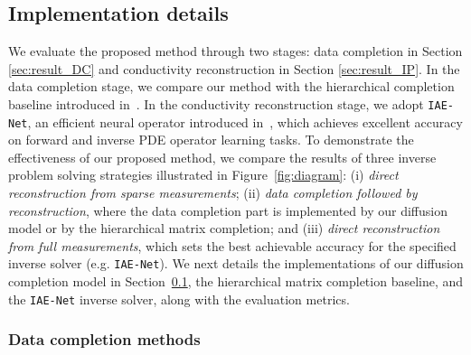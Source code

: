 \documentclass{article}
\begin{document}
\subsection{Implementation details}\label{sec:Implement_details}
We evaluate the proposed method through two stages: data completion in Section \ref{sec:result_DC} and conductivity reconstruction in Section \ref{sec:result_IP}. 
In the data completion stage, we compare our method with the hierarchical completion baseline introduced in~\citet{bui2022bridging}. In the conductivity reconstruction stage, we adopt \texttt{IAE-Net}, an efficient neural operator introduced in~\citet{ong2022integral}, which achieves excellent accuracy on forward and inverse PDE operator learning tasks.
To demonstrate the effectiveness of our proposed method, we compare the results of three inverse problem solving strategies illustrated in Figure~\ref{fig:diagram}: 
(i) \emph{direct reconstruction from sparse measurements}; 
(ii) \emph{data completion followed by reconstruction}, where the data completion part is implemented by our diffusion model or by the hierarchical matrix completion; and (iii) \emph{direct reconstruction from full measurements}, which sets the best achievable accuracy for the specified inverse solver (e.g. \texttt{IAE-Net}).
We next details the implementations of our diffusion completion model in Section~\ref{sec:Implement_details}, the hierarchical matrix completion baseline, and the \texttt{IAE-Net} inverse solver, along with the evaluation metrics. 

\subsubsection{Data completion methods}
\end{document}
